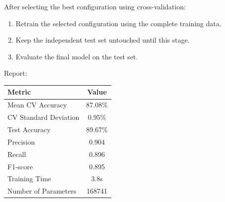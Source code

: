 \documentclass[10pt]{article}
\begin{document}
After selecting the best configuration using cross-validation:

\begin{enumerate}
\item Retrain the selected configuration using the complete training data.
\item Keep the independent test set untouched until this stage.
\item Evaluate the final model on the test set.
\end{enumerate}

Report:


\begin{center}

\begin{tabular}{|l|c|}

\hline

Metric & Value\\

\hline

Mean CV Accuracy & 87.08\%\\

CV Standard Deviation & 0.95\%\\

Test Accuracy & 89.67\%\\

Precision & 0.904\\

Recall & 0.896\\

F1-score & 0.895\\

Training Time & 3.8s\\

Number of Parameters & 168741\\

\hline

\end{tabular}

\end{center}
\end{document}
